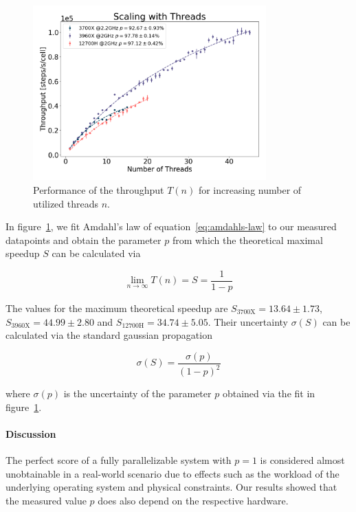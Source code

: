 \documentclass[fontsize=11pt,a4paper]{article}
\begin{document}
\begin{figure}
    \centering
    \includegraphics[width=0.8\textwidth]{figures/thread_scaling.png}
    \caption{Performance of the throughput $T(n)$ for increasing number of utilized threads $n$.}
    \label{fig:amdahls-law-fit}
\end{figure}

In figure~\ref{fig:amdahls-law-fit}, we fit Amdahl's law of equation~\ref{eq:amdahls-law} to our
measured datapoints and obtain the parameter $p$ from which the theoretical maximal speedup $S$ can
be calculated via

\begin{equation}
    \lim\limits_{n\rightarrow\infty} T(n) = S = \frac{1}{1-p}
    \label{eq:amdahls-law-maximum-speedup}
\end{equation}

The values for the maximum theoretical speedup are $S_\text{3700X}=13.64\pm1.73$,
$S_\text{3960X}=44.99\pm2.80$ and $S_\text{12700H}=34.74\pm5.05$.
Their uncertainty $\sigma(S)$ can be calculated via the standard gaussian propagation

\begin{equation}
    \sigma(S) = \frac{\sigma(p)}{(1-p)^2}
\end{equation}

where $\sigma(p)$ is the uncertainty of the parameter $p$ obtained via the fit in
figure~\ref{fig:amdahls-law-fit}.

\paragraph{Discussion}
The perfect score of a fully parallelizable system with $p=1$ is considered almost unobtainable
in a real-world scenario due to effects such as the workload of the underlying operating system
and physical constraints.
Our results showed that the measured value $p$ does also depend on the respective hardware.
\end{document}
